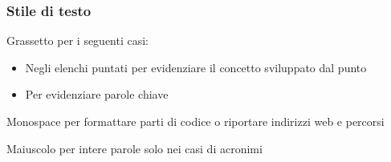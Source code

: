 \subsubsection{Stile di testo}
\item Grassetto per i seguenti casi:
  \begin{itemize}
  \item Negli elenchi puntati per evidenziare il concetto sviluppato dal punto
  \item Per evidenziare parole chiave
  \end{itemize}
\item Monospace per formattare parti di codice o riportare indirizzi web e percorsi
\item Maiuscolo per intere parole solo nei casi di acronimi
  
